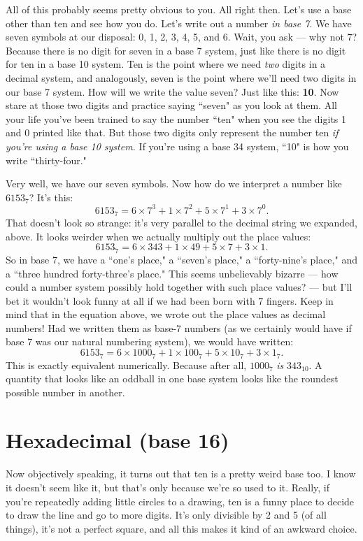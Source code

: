 All of this probably seems pretty obvious to you. All right then. Let's
use a base other than ten and see how you do. Let's write out a number
\textit{in base 7}. We have seven symbols at our disposal: 0, 1, 2, 3, 4,
5, and 6. Wait, you ask --- why not 7? Because there is no digit for seven
in a base 7 system, just like there is no digit for ten in a base 10
system. Ten is the point where we need \textit{two} digits in a decimal
system, and analogously, seven is the point where we'll need two digits in
our base 7 system. How will we write the value seven? Just like this:
\textbf{10}. Now stare at those two digits and practice saying ``seven" as
you look at them.  All your life you've been trained to say the number
``ten" when you see the digits 1 and 0 printed like that. But those two
digits only represent the number ten \textit{if you're using a base 10
system.} If you're using a base 34 system, ``10" is how you write
``thirty-four."

Very well, we have our seven symbols. Now how do we interpret a number like
$6153_7$? It's this:
\[
6153_{7} = 6 \times 7^3 + 1 \times 7^2 + 5 \times 7^1 + 3 \times 7^0.
\]
That doesn't look so strange: it's very parallel to the decimal string we
expanded, above. It looks weirder when we actually multiply out the place
values:
\[
6153_{7} = 6 \times 343 + 1 \times 49 + 5 \times 7 + 3 \times 1.
\]
So in base 7, we have a ``one's place," a ``seven's place," a
``forty-nine's place," and a ``three hundred forty-three's place." This
seems unbelievably bizarre --- how could a number system possibly hold
together with such place values? --- but I'll bet it wouldn't look funny at
all if we had been born with 7 fingers. Keep in mind that in the equation
above, we wrote out the place values as decimal numbers! Had we written
them as base-7 numbers (as we certainly would have if base 7 was our
natural numbering system), we would have written:
\[
6153_{7} = 6 \times 1000_7 + 1 \times 100_7 + 5 \times 10_7 + 3 \times 1_7.
\]
This is exactly equivalent numerically. Because after all, $1000_7$
\textit{is} $343_{10}$. A quantity that looks like an oddball in one base
system looks like the roundest possible number in another.


\section{Hexadecimal (base 16)}

Now objectively speaking, it turns out that ten is a pretty weird base too.
I know it doesn't seem like it, but that's only because we're so used to
it. Really, if you're repeatedly adding little circles to a drawing, ten is
a funny place to decide to draw the line and go to more digits. It's only
divisible by 2 and 5 (of all things), it's not a perfect square, and all
this makes it kind of an awkward choice.

